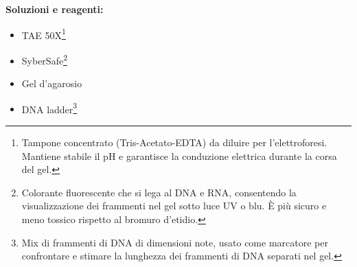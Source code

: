 \textbf{Soluzioni e reagenti:}
\begin{itemize}
  \item TAE 50X\footnote{Tampone concentrato (Tris-Acetato-EDTA) da diluire per l’elettroforesi. Mantiene stabile il pH e garantisce la conduzione elettrica durante la corsa del gel.}
  \item SyberSafe\footnote{Colorante fluorescente che si lega al DNA e RNA, consentendo la visualizzazione dei frammenti nel gel sotto luce UV o blu. È più sicuro e meno tossico rispetto al bromuro d’etidio.}
  \item Gel d’agarosio
  \item DNA ladder\footnote{Mix di frammenti di DNA di dimensioni note, usato come marcatore per confrontare e stimare la lunghezza dei frammenti di DNA separati nel gel.}
\end{itemize}


